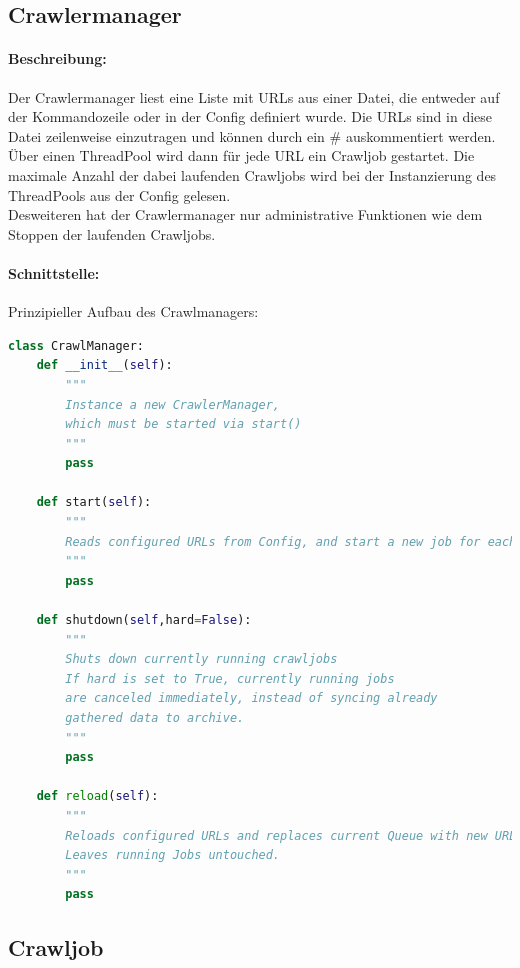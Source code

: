 \subsection{Crawlermanager}
\label{sub:crawlermanager}
\paragraph{Beschreibung:}
\label{par:beschreibung_}
Der Crawlermanager liest eine Liste mit URLs aus einer Datei, die entweder auf der Kommandozeile oder in
der Config definiert wurde. Die URLs sind in diese Datei zeilenweise einzutragen und können durch ein \# auskommentiert werden.
Über einen ThreadPool wird dann für jede URL ein Crawljob gestartet. Die maximale Anzahl der dabei laufenden Crawljobs wird bei
der Instanzierung des ThreadPools aus der Config gelesen.
\\
Desweiteren hat der Crawlermanager nur administrative Funktionen wie dem Stoppen der laufenden Crawljobs.
\paragraph{Schnittstelle:}
\label{par:schnittstelle_}
Prinzipieller Aufbau des Crawlmanagers:
\begin{lstlisting}[language=python]
class CrawlManager:
    def __init__(self):
        """
        Instance a new CrawlerManager,
        which must be started via start()
        """
        pass

    def start(self):
        """
        Reads configured URLs from Config, and start a new job for each
        """
        pass

    def shutdown(self,hard=False): 
        """
        Shuts down currently running crawljobs
        If hard is set to True, currently running jobs
        are canceled immediately, instead of syncing already
        gathered data to archive.
        """
        pass

    def reload(self):
        """
        Reloads configured URLs and replaces current Queue with new URLs.
        Leaves running Jobs untouched.
        """
        pass

\end{lstlisting}

\newpage
\subsection{Crawljob}
\label{sub:crawljob}

